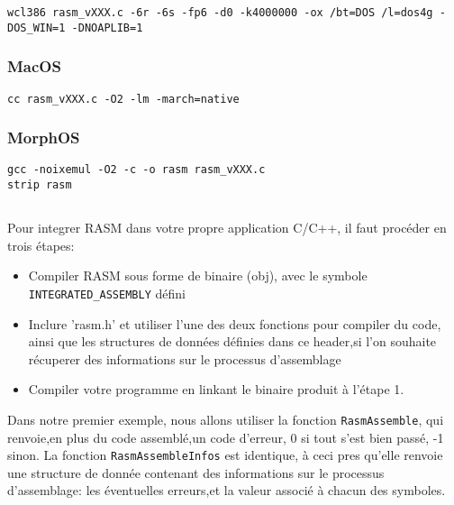 \begin{verbatim}
wcl386 rasm_vXXX.c -6r -6s -fp6 -d0 -k4000000 -ox /bt=DOS /l=dos4g -DOS_WIN=1 -DNOAPLIB=1
\end{verbatim}


\subsubsection{MacOS}

\begin{verbatim}
cc rasm_vXXX.c -O2 -lm -march=native
\end{verbatim}

\subsubsection{MorphOS}

\begin{verbatim}
gcc -noixemul -O2 -c -o rasm rasm_vXXX.c
strip rasm
\end{verbatim}


\subsection{}

\begin{xfr}
Pour integrer RASM dans votre propre application C/C++, il faut procéder en trois étapes:

\begin{itemize}
\item Compiler RASM sous forme de binaire (obj), avec le symbole \texttt{INTEGRATED\_ASSEMBLY} défini
\item Inclure 'rasm.h' et utiliser l'une des deux fonctions pour compiler du code, ainsi que les structures de données définies dans ce header,si l'on souhaite récuperer des informations sur le processus d'assemblage
\item Compiler votre programme en linkant le binaire produit à l'étape 1.
\end{itemize}

Dans notre premier exemple, nous allons utiliser la fonction \texttt{RasmAssemble}, qui renvoie,en plus du code assemblé,un code d'erreur, 0 si tout s'est bien passé, -1 sinon. La fonction \texttt{RasmAssembleInfos} est identique, à ceci pres qu'elle renvoie une structure de donnée contenant des informations sur le processus d'assemblage: les éventuelles erreurs,et la valeur associé à chacun des symboles.
\end{xfr}


